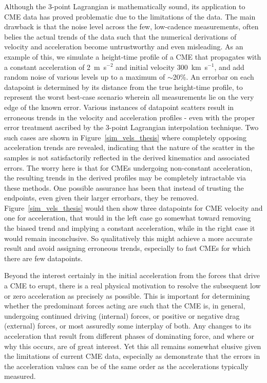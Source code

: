 \documentclass[preprint2]{aastex}
\begin{document}
Although the 3-point Lagrangian is mathematically sound, its application to CME data has proved problematic due to the limitations of the data. The main drawback is that the noise level across the few, low-cadence measurements, often belies the actual trends of the data such that the numerical derivations of velocity and acceleration become untrustworthy and even misleading. As an example of this, we simulate a height-time profile of a CME that propagates with a constant acceleration of 2~m~s$^{-2}$ and initial velocity 300~km~s$^{-1}$, and add random noise of various levels up to a maximum of $\sim$20\%. An errorbar on each datapoint is determined by its distance from the true height-time profile, to represent the worst best-case scenario wherein all measurements lie on the very edge of the known error. Various instances of datapoint scatters result in erroneous trends in the velocity and acceleration profiles - even with the proper error treatment ascribed by the 3-point Lagrangian interpolation technique. Two such cases are shown in Figure~\ref{sim_vels_thesis} where completely opposing acceleration trends are revealed, indicating that the nature of the scatter in the samples is not satisfactorily reflected in the derived kinematics and associated errors. The worry here is that for CMEs undergoing non-constant acceleration, the resulting trends in the derived profiles may be completely intractable via these methods. One possible assurance has been that instead of trusting the endpoints, even given their larger errorbars, they be removed. Figure~\ref{sim_vels_thesis} would then show three datapoints for CME velocity and one for acceleration, that would in the left case go somewhat toward removing the biased trend and implying a constant acceleration, while in the right case it would remain inconclusive. So qualitatively this might achieve a more accurate result and avoid assigning erroneous trends, especially to fast CMEs for which there are few datapoints.

Beyond the interest certainly in the initial acceleration from the forces that drive a CME to erupt, there is a real physical motivation to resolve the subsequent low or zero acceleration as precisely as possible. This is important for determining whether the predominant forces acting are such that the CME is, in general, undergoing continued driving (internal) forces, or positive or negative drag (external) forces, or most assuredly some interplay of both. Any changes to its acceleration that result from different phases of dominating force, and where or why this occurs, are of great interest. Yet this all remains somewhat elusive given the limitations of current CME data, especially as \citet{2007ApJ...657.1117W} demonstrate that the errors in the acceleration values can be of the same order as the accelerations typically measured. 
\end{document}
